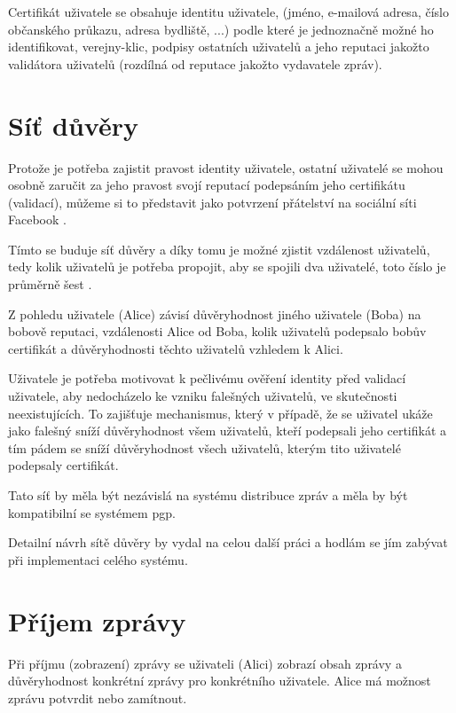 \documentclass[12pt,a4paper]{report}
\begin{document}
Certifikát uživatele se obsahuje identitu uživatele, (jméno, e-mailová adresa, číslo občanského průkazu, adresa bydliště, ...) podle které je jednoznačně možné ho identifikovat, \gls{verejny-klic}, podpisy ostatních uživatelů a jeho reputaci jakožto validátora uživatelů (rozdílná od reputace jakožto vydavatele zpráv).

\section{Síť důvěry}
\label{sec:sit_duvery}

Protože je potřeba zajistit pravost identity uživatele, ostatní uživatelé se mohou osobně zaručit za jeho pravost svojí reputací podepsáním jeho certifikátu (validací), můžeme si to představit jako potvrzení přátelství na sociální síti Facebook \citep{intro99}.

Tímto se buduje síť důvěry a díky tomu je možné zjistit vzdálenost uživatelů, tedy kolik uživatelů je potřeba propojit, aby se spojili dva uživatelé, toto číslo je průměrně šest \citep{intro99}.

Z pohledu uživatele (Alice) závisí důvěryhodnost jiného uživatele (Boba) na bobově reputaci, vzdálenosti Alice od Boba, kolik uživatelů podepsalo bobův certifikát a důvěryhodnosti těchto uživatelů vzhledem k Alici.

Uživatele je potřeba motivovat k pečlivému ověření identity před validací uživatele, aby nedocházelo ke vzniku falešných uživatelů, ve skutečnosti neexistujících. To zajišťuje mechanismus, který v případě, že se uživatel ukáže jako falešný sníží důvěryhodnost všem uživatelů, kteří podepsali jeho certifikát a tím pádem se sníží důvěryhodnost všech uživatelů, kterým tito uživatelé podepsaly certifikát.

Tato síť by měla být nezávislá na systému distribuce zpráv a měla by být kompatibilní se systémem \gls{pgp}.

Detailní návrh sítě důvěry by vydal na celou další práci a hodlám se jím zabývat při implementaci celého systému.

\section{Příjem zprávy}
\label{sec:prijem_zpravy}

Při příjmu (zobrazení) zprávy se uživateli (Alici) zobrazí obsah zprávy a důvěryhodnost konkrétní zprávy pro konkrétního uživatele. Alice má možnost zprávu potvrdit nebo zamítnout.
\end{document}

